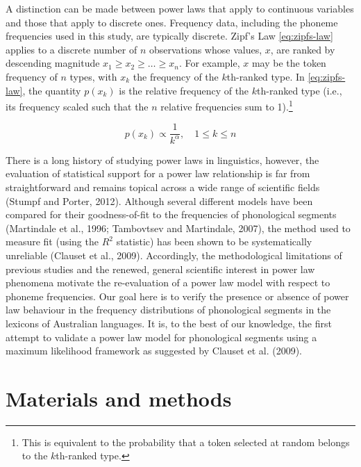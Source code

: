A distinction can be made between power laws that apply to continuous variables and those that apply to discrete ones. Frequency data, including the phoneme frequencies used in this study, are typically discrete. Zipf's Law \eqref{eq:zipfs-law} applies to a discrete number of \(n\) observations whose values, \(x\), are ranked by descending magnitude \(x_1 \geq x_2 \geq \ldots \geq x_n\). For example, \(x\) may be the token frequency of \(n\) types, with \(x_k\) the frequency of the \(k\)th-ranked type. In \eqref{eq:zipfs-law}, the quantity \(p(x_k)\) is the relative frequency of the \(k\)th-ranked type (i.e., its frequency scaled such that the \(n\) relative frequencies sum to 1).\footnote{This is equivalent to the probability that a token selected at random belongs to the \(k\)th-ranked type.}

\begin{equation}
p(x_k) \propto \frac{1}{k^{\alpha}},\quad 1 \leq k \leq n
\label{eq:zipfs-law}
\end{equation}

There is a long history of studying power laws in linguistics, however, the evaluation of statistical support for a power law relationship is far from straightforward and remains topical across a wide range of scientific fields (Stumpf and Porter, 2012). Although several different models have been compared for their goodness-of-fit to the frequencies of phonological segments (Martindale et al., 1996; Tambovtsev and Martindale, 2007), the method used to measure fit (using the \(R^2\) statistic) has been shown to be systematically unreliable (Clauset et al., 2009). Accordingly, the methodological limitations of previous studies and the renewed, general scientific interest in power law phenomena motivate the re-evaluation of a power law model with respect to phoneme frequencies. Our goal here is to verify the presence or absence of power law behaviour in the frequency distributions of phonological segments in the lexicons of Australian languages. It is, to the best of our knowledge, the first attempt to validate a power law model for phonological segments using a maximum likelihood framework as suggested by Clauset et al. (2009).

\hypertarget{materials-and-methods}{%
\section*{Materials and methods}\label{materials-and-methods}}

